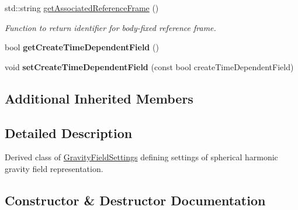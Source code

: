 \begin{DoxyCompactItemize}
std\+::string \hyperlink{classtudat_1_1simulation__setup_1_1SphericalHarmonicsGravityFieldSettings_a7f45f92da7b88e2cc64b8a54a2f987d2}{get\+Associated\+Reference\+Frame} ()
\begin{DoxyCompactList}\small\item\em Function to return identifier for body-\/fixed reference frame. \end{DoxyCompactList}\item 
bool {\bfseries get\+Create\+Time\+Dependent\+Field} ()\hypertarget{classtudat_1_1simulation__setup_1_1SphericalHarmonicsGravityFieldSettings_a38e4e596f84064b80d43fbd97819a497}{}\label{classtudat_1_1simulation__setup_1_1SphericalHarmonicsGravityFieldSettings_a38e4e596f84064b80d43fbd97819a497}

\item 
void {\bfseries set\+Create\+Time\+Dependent\+Field} (const bool create\+Time\+Dependent\+Field)\hypertarget{classtudat_1_1simulation__setup_1_1SphericalHarmonicsGravityFieldSettings_ab605aa9f057ceac71628addee765e37a}{}\label{classtudat_1_1simulation__setup_1_1SphericalHarmonicsGravityFieldSettings_ab605aa9f057ceac71628addee765e37a}

\end{DoxyCompactItemize}
\subsection*{Additional Inherited Members}


\subsection{Detailed Description}
Derived class of \hyperlink{classtudat_1_1simulation__setup_1_1GravityFieldSettings}{Gravity\+Field\+Settings} defining settings of spherical harmonic gravity field representation. 

\subsection{Constructor \& Destructor Documentation}
